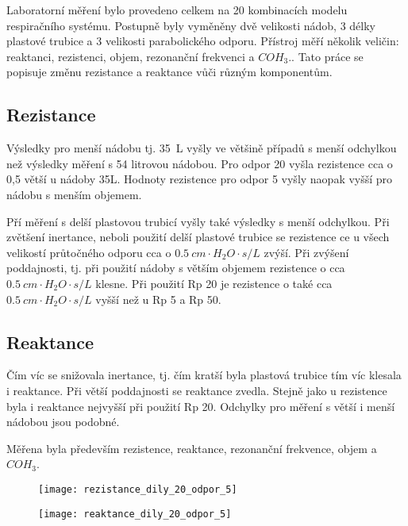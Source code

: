 Laboratorní měření bylo provedeno celkem na 20 kombinacích modelu respiračního systému. Postupně byly vyměněny dvě velikosti nádob, 3 délky plastové trubice a 3 velikosti parabolického odporu. Přístroj měří několik veličin: reaktanci, rezistenci, objem, rezonanční frekvenci a $COH_{3}$.. Tato práce se popisuje změnu rezistance a reaktance vůči různým komponentům.  

 
\subsection{Rezistance}

Výsledky pro menší nádobu tj. \SI{35}{L} vyšly ve většině případů s menší odchylkou než výsledky měření s 54 litrovou nádobou. Pro odpor 20 vyšla rezistence cca o 0,5 větší u nádoby 35L. Hodnoty rezistence pro odpor 5 vyšly naopak vyšší pro nádobu s menším objemem. 

Pří měření s delší plastovou trubicí vyšly také výsledky s menší odchylkou. 
Při zvětšení inertance, neboli použití delší plastové trubice se rezistence ce u všech velikostí průtočného odporu cca o  $\SI{0,5}{ cm\cdot H_{2}O \cdot s/L} $ zvýší. 
Při zvýšení poddajnosti, tj. při použití nádoby s  větším objemem rezistence o cca  $\SI{0,5}{ cm\cdot H_{2}O \cdot s/L} $  klesne. 
Při použití Rp 20 je rezistence o také cca  $\SI{0,5}{ cm\cdot H_{2}O \cdot s/L} $  vyšší než u Rp 5 a Rp 50. 

\subsection{Reaktance}

Čím víc se snižovala inertance, tj. čím kratší byla plastová trubice tím víc klesala i reaktance. Při větší poddajnosti se reaktance zvedla. Stejně jako u rezistence byla i reaktance nejvyšší při použití Rp 20. Odchylky pro měření s větší i menší nádobou jsou podobné. 


Měřena byla především rezistence, reaktance, rezonanční frekvence, objem a $COH_{3}$. 



\begin{figure}
\centering
\begin{minipage}{.5\textwidth}
  \centering
  \texttt{[image: rezistance\_dily\_20\_odpor\_5]}
\captionsetup{justification=centering}
\end{minipage}%
\begin{minipage}{.5\textwidth}
  \centering
  \texttt{[image: reaktance\_dily\_20\_odpor\_5]}
\captionsetup{justification=centering}
\end{minipage}
\end{figure}


